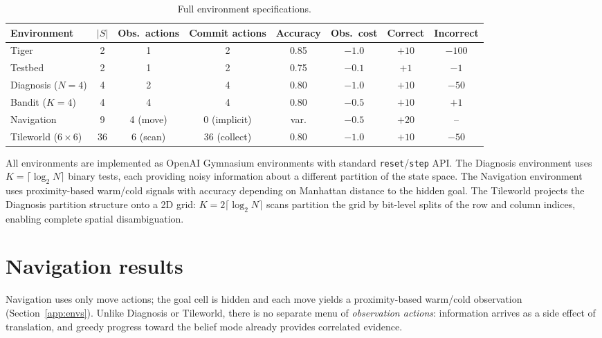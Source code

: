 \documentclass{article}
\begin{document}
\begin{table}[h]
\centering
\caption{Full environment specifications.}
\begin{small}
\begin{tabular}{lccccccc}
\toprule
Environment & $|S|$ & Obs.\ actions & Commit actions & Accuracy & Obs.\ cost & Correct & Incorrect \\
\midrule
Tiger & 2 & 1 & 2 & 0.85 & $-1.0$ & $+10$ & $-100$ \\
Testbed & 2 & 1 & 2 & 0.75 & $-0.1$ & $+1$ & $-1$ \\
Diagnosis ($N{=}4$) & 4 & 2 & 4 & 0.80 & $-1.0$ & $+10$ & $-50$ \\
Bandit ($K{=}4$) & 4 & 4 & 4 & 0.80 & $-0.5$ & $+10$ & $+1$ \\
Navigation & 9 & 4 (move) & 0 (implicit) & var. & $-0.5$ & $+20$ & -- \\
Tileworld ($6{\times}6$) & 36 & 6 (scan) & 36 (collect) & 0.80 & $-1.0$ & $+10$ & $-50$ \\
\bottomrule
\end{tabular}
\end{small}
\end{table}

All environments are implemented as OpenAI Gymnasium environments with standard \texttt{reset}/\texttt{step} API. The Diagnosis environment uses $K = \lceil \log_2 N \rceil$ binary tests, each providing noisy information about a different partition of the state space. The Navigation environment uses proximity-based warm/cold signals with accuracy depending on Manhattan distance to the hidden goal. The Tileworld projects the Diagnosis partition structure onto a 2D grid: $K = 2 \lceil \log_2 N \rceil$ scans partition the grid by bit-level splits of the row and column indices, enabling complete spatial disambiguation.

\section{Navigation results}
\label{app:navigation}

Navigation uses only move actions; the goal cell is hidden and each move yields a proximity-based warm/cold observation (Section~\ref{app:envs}). Unlike Diagnosis or Tileworld, there is no separate menu of \emph{observation actions}: information arrives as a side effect of translation, and greedy progress toward the belief mode already provides correlated evidence.
\end{document}
